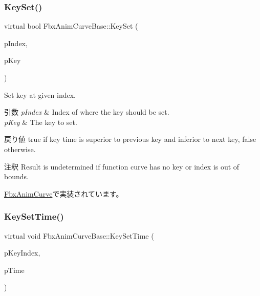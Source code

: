 \subsubsection{\texorpdfstring{Key\+Set()}{KeySet()}}
{\footnotesize\ttfamily virtual bool Fbx\+Anim\+Curve\+Base\+::\+Key\+Set (\begin{DoxyParamCaption}\item[{int}]{p\+Index,  }\item[{\hyperlink{class_fbx_anim_curve_key_base}{Fbx\+Anim\+Curve\+Key\+Base} \&}]{p\+Key }\end{DoxyParamCaption})\hspace{0.3cm}{\ttfamily [pure virtual]}}

Set key at given index. 
\begin{DoxyParams}{引数}
{\em p\+Index} & Index of where the key should be set. \\
\hline
{\em p\+Key} & The key to set. \\
\hline
\end{DoxyParams}
\begin{DoxyReturn}{戻り値}
{\ttfamily true} if key time is superior to previous key and inferior to next key, {\ttfamily false} otherwise. 
\end{DoxyReturn}
\begin{DoxyRemark}{注釈}
Result is undetermined if function curve has no key or index is out of bounds. 
\end{DoxyRemark}


\hyperlink{class_fbx_anim_curve_a8f36f89bd5fbaa4f180789f4d9faf84f}{Fbx\+Anim\+Curve}で実装されています。

\mbox{\label{class_fbx_anim_curve_base_afce0ede7336b9639c1e7ac08adf3e6df}} 
\subsubsection{\texorpdfstring{Key\+Set\+Time()}{KeySetTime()}}
{\footnotesize\ttfamily virtual void Fbx\+Anim\+Curve\+Base\+::\+Key\+Set\+Time (\begin{DoxyParamCaption}\item[{int}]{p\+Key\+Index,  }\item[{\hyperlink{class_fbx_time}{Fbx\+Time}}]{p\+Time }\end{DoxyParamCaption})\hspace{0.3cm}{\ttfamily [pure virtual]}}

